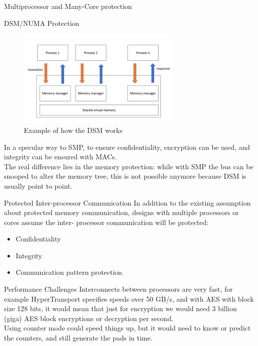 \begin{section}{Multiprocessor and Many-Core protection}
\begin{subsection}{DSM/NUMA Protection}
    \begin{figure}[H]
      \centering
      \includegraphics[width=0.7\textwidth]{img/hardware/DMS example.png}
      \caption{Example of how the DSM works}
    \end{figure}
    In a specular way to SMP, to ensure confidentiality, encryption can be used, and integrity can
    be ensured with MACs.\\
    The real difference lies in the memory protection: while with SMP the bus can be snooped to
    alter the memory tree, this is not possible anymore because DSM is usually point to point.

  \end{subsection}
  \begin{subsection}{Protected Inter-processor Communication}
    In addition to the existing assumption about protected memory communication, designs with
    multiple processors or cores assume the inter- processor communication will be protected:
    \begin{itemize}
      \item Confidentiality
      \item Integrity
      \item Communication pattern protection
    \end{itemize}
  \end{subsection}

  \begin{subsection}{Performance Challenges}
    Interconnects between processors are very fast, for example HyperTransport specifies speeds over
    50 GB/s, and with AES with block size 128 bits, it would mean that just for encryption we would
    need 3 billion (giga) AES block encryptions or decryption per second.\\
    Using counter mode could speed things up, but it would need to know or predict the counters, and
    still generate the pads in time.
  \end{subsection}
\end{section}
